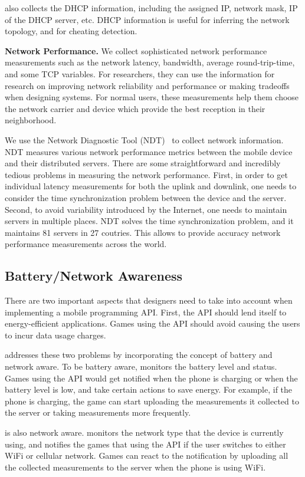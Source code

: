 \name{} also collects the DHCP information, including the assigned IP, network mask, IP of the DHCP server, etc.
DHCP information is useful for inferring the network topology, and for cheating detection.
 
 
{\bfseries Network Performance.} We collect sophisticated network performance measurements 
such as the network latency, bandwidth, average round-trip-time, and some TCP variables. 
For researchers, they can use the information for research on improving network reliability and performance or
 making tradeoffs when designing systems. 
For normal users, these measurements help them choose the network carrier and device which provide
 the best reception in their neighborhood. 

We use the Network Diagnostic Tool (NDT)~\cite{NDT} to collect network information. NDT measures various network 
performance metrics between the mobile device and their distributed servers. There are some straightforward 
and incredibly tedious problems in measuring the network performance. First, in order to get individual latency
measurements for both the uplink and downlink, one needs to consider the time 
synchronization problem between the device and the server. Second, to avoid variability introduced by the Internet, 
one needs to maintain servers in multiple places. 
NDT solves the time synchronization problem, and it maintains 81 servers in 27 coutries. This allows \name{}
to provide accuracy network performance measurements across the world.

\subsection{Battery/Network Awareness}
\label{ss:awareness}
There are two important aspects that designers need to take into account when implementing a mobile 
programming API. First, the API should lend itself to energy-efficient applications. 
Games using the API should avoid causing the users to incur data usage charges. 
 
\name{} addresses these two problems by incorporating the concept of battery and network aware. 
To be battery aware, \name{} monitors the battery level and status. Games using the API would get
notified when the phone is charging or when the battery level is low, and take certain actions
to save energy. For example, if the phone is charging, the game can start uploading the measurements 
it collected to the server or taking measurements more frequently. 

\name{} is also network aware. \name{} monitors the network type that the device is currently using, 
and notifies the games that using the API if the user switches to either WiFi or cellular network.
Games can react to the notification by uploading all the collected measurements to the server when
the phone is using WiFi.

